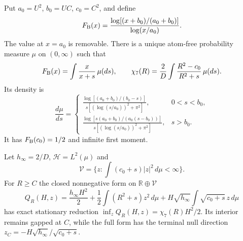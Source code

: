 \documentclass[12pt,a4paper]{article}
\begin{document}
\begin{theorem}
\label{p3d:thm:v2216-positive-born-provider}
Put $a_0=U^2$, $b_0=UC$, $c_0=C^2$, and define
\[
 F_{\rm B}(x)=\frac{\log[(x+b_0)/(a_0+b_0)]}{\log(x/a_0)}.
\]
The value at $x=a_0$ is removable. There is a unique atom-free probability
measure $\mu$ on $(0,\infty)$ such that
\begin{equation}
 F_{\rm B}(x)=\int\frac{x}{x+s}\,\mu(ds),\qquad
 \chi_7(R)=\frac2D\int\frac{R^2-c_0}{R^2+s}\,\mu(ds).
 \label{p3d:eq:v2216-born-resolvent}
\end{equation}
Its density is
\[
 \frac{d\mu}{ds}=
 \begin{cases}
 \displaystyle\frac{\log[(a_0+b_0)/(b_0-s)]}
 {s[(\log(s/a_0))^2+\pi^2]},&0<s<b_0,\\[6pt]
 \displaystyle\frac{\log[s(a_0+b_0)/(a_0(s-b_0))]}
 {s[(\log(s/a_0))^2+\pi^2]},&s>b_0.
 \end{cases}
\]
It has $F_{\rm B}(c_0)=1/2$ and infinite first moment.

Let $h_\infty=2/D$, $\mathcal H=L^2(\mu)$ and
\[
 \mathcal V=\{z:\int(c_0+s)|z|^2\,d\mu<\infty\}.
\]
For $R\ge C$ the closed nonnegative form on
$\mathbb R\oplus\mathcal V$
\[
 Q_R(H,z)=\frac{h_\infty H^2}{2}
 +\frac12\int(R^2+s)z^2\,d\mu
 +H\sqrt{h_\infty}\int\sqrt{c_0+s}\,z\,d\mu
\]
has exact stationary reduction
$\inf_z Q_R(H,z)=\chi_7(R)H^2/2$. Its interior remains gapped at $C$,
while the full form has the terminal null direction
$z_C=-H\sqrt{h_\infty}/\sqrt{c_0+s}$.
\end{theorem}
\end{document}
